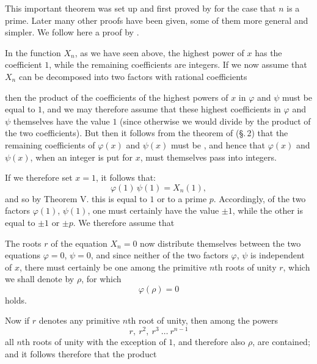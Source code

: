 
This important theorem was set up and first proved by  for
the case that $n$ is a prime. Later many other proofs have been given, some
of them more general and simpler. We follow here a proof by
.

In the function $X_n$, as we have seen above, the highest power of $x$ has
the coefficient $1$, while the remaining coefficients are integers. If we
now assume that $X_n$ can be decomposed into two factors with rational
coefficients


then the product of the coefficients of the highest powers of $x$ in
$\varphi$ and $\psi$ must be equal to $1$, and we may therefore assume that
these highest coefficients in $\varphi$ and $\psi$ themselves have the value
$1$ (since otherwise we would divide by the product of the two
coefficients). But then it follows from the theorem of 
(\S.\,2) that the remaining coefficients of $\varphi(x)$ and $\psi(x)$ must
be , and hence that $\varphi(x)$ and $\psi(x)$, when an integer is
put for $x$, must themselves pass into integers.

If we therefore set $x = 1$, it follows that:
\[
\varphi(1)\,\psi(1) = X_n(1),
\]
and so by Theorem V. this is equal to $1$ or to a prime $p$. Accordingly,
of the two factors $\varphi(1)$, $\psi(1)$, one must certainly have the
value $\pm 1$, while the other is equal to $\pm 1$ or $\pm p$. We therefore
assume that


The roots $r$ of the equation $X_n = 0$ now distribute themselves between
the two equations $\varphi = 0$, $\psi = 0$, and since neither of the two
factors $\varphi$, $\psi$ is independent of $x$, there must certainly be
one among the primitive $n$th roots of unity $r$, which we shall denote by
$\rho$, for which
\[
\varphi(\rho) = 0
\]
holds.

Now if $r$ denotes any primitive $n$th root of unity, then among the powers
\[
r,\ r^2,\ r^3\ \dots\ r^{n-1}
\]
all $n$th roots of unity with the exception of $1$, and therefore also
$\rho$, are contained; and it follows therefore that the product
